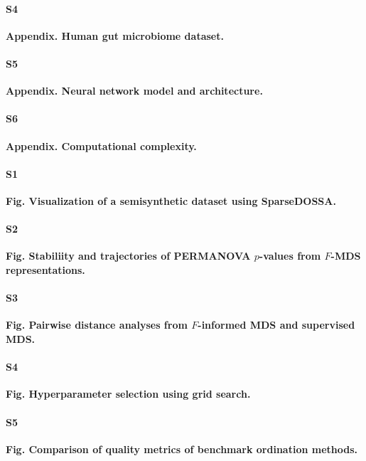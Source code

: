 \documentclass[10pt,letterpaper]{article}
\newcommand{\1}{{\rm 1}\kern-0.24em{\rm I}}
\begin{document}
\paragraph*{S4}\hspace{-2ex}
\label{sec:app4_rev}
{\bf Appendix. Human gut microbiome dataset.}

\paragraph*{S5}\hspace{-2ex}
\label{sec:app5_rev}
{\bf Appendix. Neural network model and architecture.}

\paragraph*{S6}\hspace{-2ex}
\label{sec:app6_rev}
{\bf Appendix. Computational complexity.}

\paragraph*{S1}\hspace{-2ex}
\label{fig:sim_data_vis}
{\bf Fig. Visualization of a semisynthetic dataset using SparseDOSSA.}

\paragraph*{S2}\hspace{-2ex}
\label{fig:sim_fmds_track}
{\bf Fig. Stabiliity and trajectories of PERMANOVA $p$-values from $F$-MDS representations.}

\paragraph*{S3}\hspace{-2ex}
\label{fig:sim_fmds_smds}
\textbf{Fig. Pairwise distance analyses from $F$-informed MDS and supervised MDS.}

\paragraph*{S4}\hspace{-2ex}
\label{fig:fmds_gridsearch}
\textbf{Fig. Hyperparameter selection using grid search.}

\paragraph*{S5}\hspace{-2ex}
\label{fig:sim_eval_all}
\textbf{Fig. Comparison of quality metrics of benchmark ordination methods.}
\end{document}
